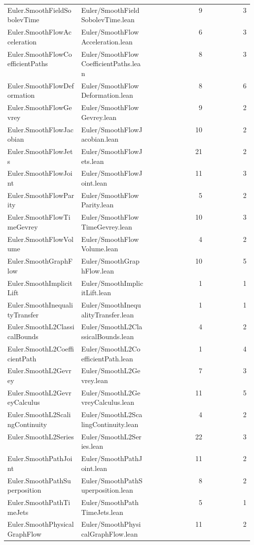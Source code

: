 \begin{longtable}{p{0.30\linewidth}p{0.28\linewidth}rr}
Euler.SmoothFieldSobolevTime & Euler/SmoothFieldSobolevTime.lean & 9 & 3\\
Euler.SmoothFlowAcceleration & Euler/SmoothFlowAcceleration.lean & 6 & 3\\
Euler.SmoothFlowCoefficientPaths & Euler/SmoothFlowCoefficientPaths.lean & 8 & 3\\
Euler.SmoothFlowDeformation & Euler/SmoothFlowDeformation.lean & 8 & 6\\
Euler.SmoothFlowGevrey & Euler/SmoothFlowGevrey.lean & 9 & 2\\
Euler.SmoothFlowJacobian & Euler/SmoothFlowJacobian.lean & 10 & 2\\
Euler.SmoothFlowJets & Euler/SmoothFlowJets.lean & 21 & 2\\
Euler.SmoothFlowJoint & Euler/SmoothFlowJoint.lean & 11 & 3\\
Euler.SmoothFlowParity & Euler/SmoothFlowParity.lean & 5 & 2\\
Euler.SmoothFlowTimeGevrey & Euler/SmoothFlowTimeGevrey.lean & 10 & 3\\
Euler.SmoothFlowVolume & Euler/SmoothFlowVolume.lean & 4 & 2\\
Euler.SmoothGraphFlow & Euler/SmoothGraphFlow.lean & 10 & 5\\
Euler.SmoothImplicitLift & Euler/SmoothImplicitLift.lean & 1 & 1\\
Euler.SmoothInequalityTransfer & Euler/SmoothInequalityTransfer.lean & 1 & 1\\
Euler.SmoothL2ClassicalBounds & Euler/SmoothL2ClassicalBounds.lean & 4 & 2\\
Euler.SmoothL2CoefficientPath & Euler/SmoothL2CoefficientPath.lean & 1 & 4\\
Euler.SmoothL2Gevrey & Euler/SmoothL2Gevrey.lean & 7 & 3\\
Euler.SmoothL2GevreyCalculus & Euler/SmoothL2GevreyCalculus.lean & 11 & 5\\
Euler.SmoothL2ScalingContinuity & Euler/SmoothL2ScalingContinuity.lean & 4 & 2\\
Euler.SmoothL2Series & Euler/SmoothL2Series.lean & 22 & 3\\
Euler.SmoothPathJoint & Euler/SmoothPathJoint.lean & 11 & 2\\
Euler.SmoothPathSuperposition & Euler/SmoothPathSuperposition.lean & 8 & 2\\
Euler.SmoothPathTimeJets & Euler/SmoothPathTimeJets.lean & 5 & 1\\
Euler.SmoothPhysicalGraphFlow & Euler/SmoothPhysicalGraphFlow.lean & 11 & 2\\

\end{longtable}
